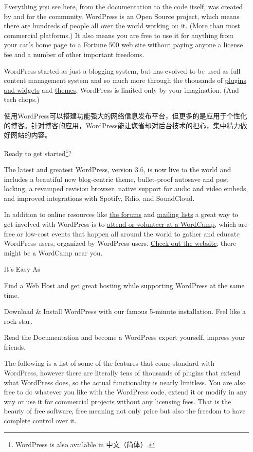 Everything you see here, from the documentation to the code itself, was created by and for the community. WordPress is an Open Source project, which means there are hundreds of people all over the world working on it. (More than most commercial platforms.) It also means you are free to use it for anything from your cat's home page to a Fortune 500 web site without paying anyone a license fee and a number of other important freedoms.

WordPress started as just a blogging system, but has evolved to be used as full content management system and so much more through the thousands of \href{http://wordpress.org/plugins/}{plugins and widgets} and \href{http://wordpress.org/themes/}{themes}, WordPress is limited only by your imagination. (And tech chops.)

使用WordPress可以搭建功能强大的网络信息发布平台，但更多的是应用于个性化的博客。针对博客的应用，WordPress能让您省却对后台技术的担心，集中精力做好网站的内容。

Ready to get started\footnote{WordPress is also available in 中文（简体）.}? 

The latest and greatest WordPress, version 3.6, is now live to the world and includes a beautiful new blog-centric theme, bullet-proof autosave and post locking, a revamped revision browser, native support for audio and video embeds, and improved integrations with Spotify, Rdio, and SoundCloud. 

In addition to online resources like \href{http://wordpress.org/support/}{the forums} and \href{http://codex.wordpress.org/Mailing_Lists}{mailing lists} a great way to get involved with WordPress is to \href{http://wordcamp.org/}{attend or volunteer at a WordCamp}, which are free or low-cost events that happen all around the world to gather and educate WordPress users, organized by WordPress users. \href{http://wordcamp.org/}{Check out the website}, there might be a WordCamp near you.

{It's} Easy As
\begin{compactenum}
\item Find a Web Host and get great hosting while supporting WordPress at the same time.
\item Download \& Install WordPress with our famous 5-minute installation. Feel like a rock star.
\item Read the Documentation and become a WordPress expert yourself, impress your friends.
\end{compactenum}

The following is a list of some of the features that come standard with WordPress, however there are literally tens of thousands of plugins that extend what WordPress does, so the actual functionality is nearly limitless. You are also free to do whatever you like with the WordPress code, extend it or modify in any way or use it for commercial projects without any licensing fees. That is the beauty of free software, free meaning not only price but also the freedom to have complete control over it.

